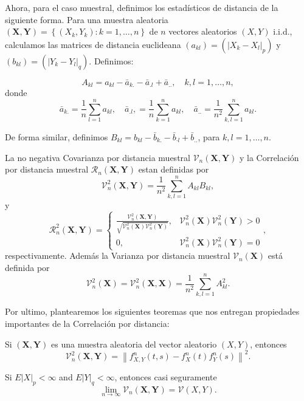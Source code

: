 	Ahora, para el caso muestral, definimos los estad\'isticos de distancia de la siguiente forma. Para una muestra aleatoria $(\mathbf{X}, \mathbf{Y})=\left\{\left(X_k, Y_k\right): k=1, \ldots, n\right\}$ de $n$ vectores aleatorios $(X, Y)$ i.i.d., calculamos las matrices de distancia euclideana  $\left(a_{k l}\right)=\left(\left|X_k-X_l\right|_p\right)$ y $\left(b_{k l}\right)=\left(\left|Y_k-Y_l\right|_q\right)$. Definimos:

	$$
	A_{k l}=a_{k l}-\bar{a}_{k .}-\bar{a}_{. l}+\bar{a}_{. .}, \quad k, l=1, \ldots, n,
	$$
	donde
	$$
	\bar{a}_{k .}=\frac{1}{n} \sum_{l=1}^n a_{k l}, \quad \bar{a}_{. l},=\frac{1}{n} \sum_{k=1}^n a_{k l}, \quad \bar{a}_{. .}=\frac{1}{n^2} \sum_{k, l=1}^n a_{k l} .
	$$
	
	De forma similar, definimos $B_{k l}=b_{k l}-\bar{b}_{k .}-\bar{b}_{\cdot l}+\bar{b}_{. .}$, para $k, l=1, \ldots, n$.

	\begin{defn}
		La no negativa Covarianza por distancia muestral $\mathcal{V}_n(\mathbf{X}, \mathbf{Y})$ y la Correlaci\'on por distancia muestral $\mathcal{R}_n(\mathbf{X}, \mathbf{Y})$ estan definidas por
		$$
		\mathcal{V}_n^2(\mathbf{X}, \mathbf{Y})=\frac{1}{n^2} \sum_{k, l=1}^n A_{k l} B_{k l},
		$$
		y
		$$
		\mathcal{R}_n^2(\mathbf{X}, \mathbf{Y})= \begin{cases}\frac{\mathcal{V}_n^2(\mathbf{X}, \mathbf{Y})}{\sqrt{\mathcal{V}_n^2(\mathbf{X}) \mathcal{V}_n^2(\mathbf{Y})}}, & \mathcal{V}_n^2(\mathbf{X}) \mathcal{V}_n^2(\mathbf{Y})>0 \\ 0, & \mathcal{V}_n^2(\mathbf{X}) \mathcal{V}_n^2(\mathbf{Y})=0\end{cases},
		$$
		respectivamente. Adem\'as la Varianza por distancia muestral $\mathcal{V}_n(\mathbf{X})$ est\'a definida por
		$$
		\mathcal{V}_n^2(\mathbf{X})=\mathcal{V}_n^2(\mathbf{X}, \mathbf{X})=\frac{1}{n^2} \sum_{k, l=1}^n A_{k l}^2 .
		$$
	\end{defn}

	Por ultimo, plantearemos los siguientes teoremas que nos entregan  propiedades importantes de la Correlaci\'on por distancia:

	\begin{thm}
		Si $(\mathbf{X}, \mathbf{Y})$ es una muestra aleatoria del vector aleatorio $(X, Y)$, entonces
		$$
		\mathcal{V}_n^2(\mathbf{X}, \mathbf{Y})=\left\|f_{X, Y}^n(t, s)-f_X^n(t) f_Y^n(s)\right\|^2 .
		$$
	\end{thm}
	\begin{thm}
		Si $E|X|_p<\infty$ and $E|Y|_q<\infty$, entonces casi seguramente
		$$
		\lim _{n \rightarrow \infty} \mathcal{V}_n(\mathbf{X}, \mathbf{Y})=\mathcal{V}(X, Y) .
		$$
	\end{thm}
	
